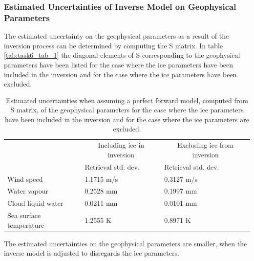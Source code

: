 \documentclass[11pt, a4paper]{article}
\begin{document}
\subsubsection{Estimated Uncertainties of Inverse Model on Geophysical Parameters}
The estimated uncertainty on the geophysical parameters as a result of the inversion process can be determined by computing the S matrix. In table \ref{tab:task6_tab_1} the diagonal elements of S corresponding to the geophysical parameters have been listed for the case where the ice parameters have been included in the inversion and for the case where the ice parameters have been excluded.
\newline 

\begin{table}[h!]
	\centering
	\begin{tabular}{@{}p{4.0cm}p{3.3cm}p{3.3cm}@{}}
		\tabularnewline
		& \multicolumn{1}{c}{Including ice in inversion} & \multicolumn{1}{c}{Excluding ice from inversion}
		\tabularnewline
		\cmidrule(r{1em}){2-2} \cmidrule(l{1em}){3-3}
		& Retrieval std. dev. & Retrieval std. dev.
		\tabularnewline
		\midrule
		Wind speed	& 1.1715 m/s	& 0.3127 m/s		\\
		Water vapour		& 0.2528 mm	& 0.1997 mm		\\
		Cloud liquid water		& 0.0211 mm	& 0.0101 mm	 \\
		Sea surface temperature	& 1.2555 K	& 0.8971 K 	\\
		\midrule
	\end{tabular}
	\caption{Estimated uncertainties when assuming a perfect forward model, computed from S matrix, of the geophysical parameters for the case where the ice parameters have been included in the inversion and for the case where the ice parameters are excluded.}
	\label{tab:task6_tab_2}
\end{table}

The estimated uncertainties on the geophysical parameters are smaller, when the inverse model is adjusted to disregards the ice parameters.
\end{document}
